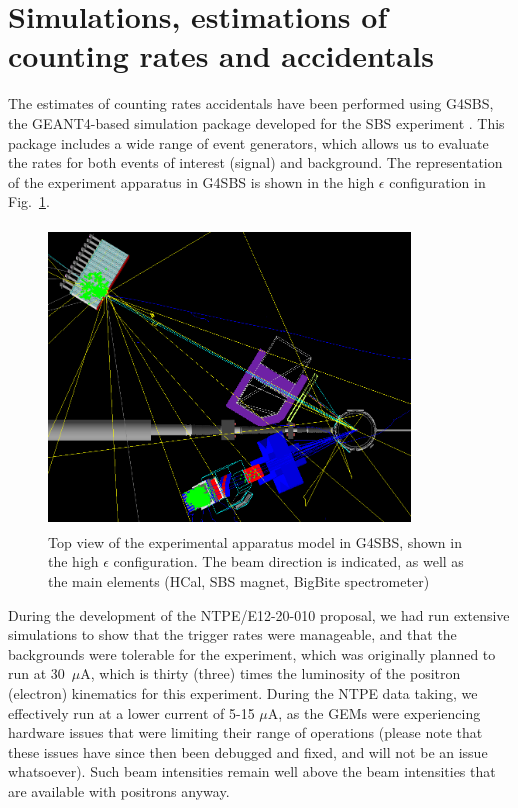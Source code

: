
\section{Simulations, estimations of counting rates and accidentals}\label{sec:simu}

The estimates of counting rates accidentals have been performed using G4SBS, the GEANT4-based simulation package developed for the SBS experiment \cite{g4sbs}.
This package includes a wide range of event generators, which allows us to evaluate the rates for both events of interest (signal) and background.
The representation of the experiment apparatus in G4SBS is shown in the high $\epsilon$ configuration in Fig.~\ref{fig:g4sbssetup}. 

\begin{figure}[!h]
  \centering
    \includegraphics[width=9.6cm,height=8cm]{Plots/SetupHiEPoint.png}
    \caption{Top view of the experimental apparatus model in G4SBS, shown in the high $\epsilon$ configuration. The beam direction is indicated, as well as the main elements (HCal, SBS magnet, BigBite spectrometer)}
    \label{fig:g4sbssetup}
\end{figure}
%
During the development of the NTPE/E12-20-010 proposal, we had run extensive simulations to show that the trigger rates were manageable, and that the backgrounds were tolerable for the experiment, which was originally planned to run at 30~$\mu$A, which is thirty (three) times the luminosity of the positron (electron) kinematics for this experiment.
During the NTPE data taking, we effectively run at a lower current of 5-15 $\mu$A, as the GEMs were experiencing hardware issues that were limiting their range of operations (please note that these issues have since then been debugged and fixed, and will not be an issue whatsoever). Such beam intensities remain well above the beam intensities that are available with positrons anyway.

